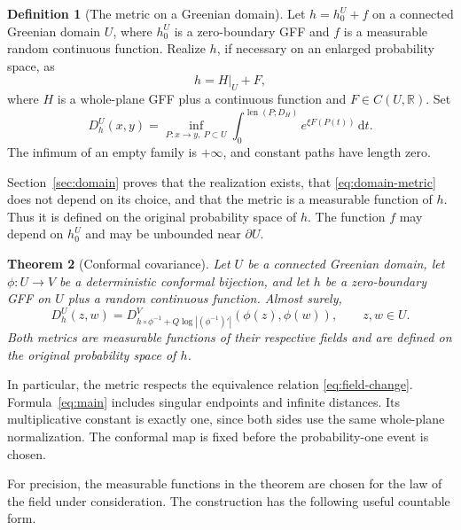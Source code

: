 \documentclass[11pt]{article}
\newtheorem{theorem}{Theorem}[section]
\theoremstyle{definition}
\newtheorem{definition}[theorem]{Definition}
\theoremstyle{remark}
\newcommand{\R}{\mathbb R}
\newcommand{\len}{\operatorname{len}}
\newcommand{\dd}{\,\mathrm d}
\begin{document}
\begin{definition}[The metric on a Greenian domain]\label{def:domain}
Let $h=h_0^U+f$ on a connected Greenian domain $U$, where $h_0^U$
is a zero-boundary GFF and $f$ is a measurable random continuous
function. Realize $h$, if necessary on an enlarged probability
space, as
\begin{equation}\label{eq:realization}
                  h=H|_U+F,
\end{equation}
where $H$ is a whole-plane GFF plus a continuous function and
$F\in C(U,\R)$. Set
\begin{equation}\label{eq:domain-metric}
 D_h^U(x,y)=\inf_{P:x\to y,\ P\subset U}
          \int_0^{\len(P;D_H)}e^{\xi F(P(t))}\dd t.
\end{equation}
The infimum of an empty family is $+\infty$, and constant paths
have length zero.
\end{definition}

Section~\ref{sec:domain} proves that the realization exists, that
\eqref{eq:domain-metric} does not depend on its choice, and that the
metric is a measurable function of $h$. Thus it is defined on the
original probability space of $h$. The function $f$ may depend on
$h_0^U$ and may be unbounded near $\partial U$.

\begin{theorem}[Conformal covariance]\label{thm:main}
Let $U$ be a connected Greenian domain, let $\phi:U\to V$ be a
deterministic conformal bijection, and let $h$ be a zero-boundary
GFF on $U$ plus a random continuous function. Almost surely,
\begin{equation}\label{eq:main}
 D_h^U(z,w)=
 D_{h\circ\phi^{-1}+Q\log|(\phi^{-1})'|}^{V}
                  (\phi(z),\phi(w)),\qquad z,w\in U.
\end{equation}
Both metrics are measurable functions of their respective fields
and are defined on the original probability space of $h$.
\end{theorem}

In particular, the metric respects the equivalence relation
\eqref{eq:field-change}. Formula~\eqref{eq:main} includes singular
endpoints and infinite distances. Its multiplicative constant is
exactly one, since both sides use the same whole-plane normalization.
The conformal map is fixed before the probability-one event is chosen.

For precision, the measurable functions in the theorem are chosen
for the law of the field under consideration. The construction has
the following useful countable form.
\end{document}

